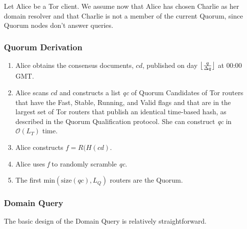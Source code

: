 Let Alice be a Tor client. We assume now that Alice has chosen Charlie as her domain resolver and that Charlie is not a member of the current Quorum, since Quorum nodes don't answer queries.

\subsubsection{Quorum Derivation}

\begin{enumerate}
	\item Alice obtains the consensus documents, $ cd $, published on day $ \floor[\big]{\frac{q}{\Delta q}} $ at 00:00 GMT.
	\item Alice scans $ cd $ and constructs a list \emph{qc} of Quorum Candidates of Tor routers that have the Fast, Stable, Running, and Valid flags and that are in the largest set of Tor routers that publish an identical time-based hash, as described in the Quorum Qualification protocol. She can construct \emph{qc} in $ \mathcal{O}(L_{T}) $ time.
	\item Alice constructs $ f = \mathit{R}(H(\mathit{cd}) $.
	\item Alice uses \emph{f} to randomly scramble \emph{qc}.
	\item The first $ \mathrm{min}(\mathrm{size}(\mathit{qc}), L_{Q}) $ routers are the Quorum.
\end{enumerate}

\subsubsection{Domain Query}

The basic design of the Domain Query is relatively straightforward. 

